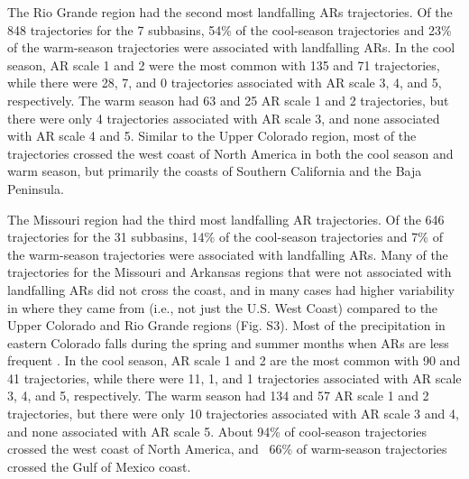 \documentclass[draft]{agujournal2019}
\begin{document}
The Rio Grande region had the second most landfalling ARs trajectories. Of the 848 trajectories for the 7 subbasins, 54\% of the cool-season trajectories and 23\% of the warm-season trajectories were associated with landfalling ARs. In the cool season, AR scale 1 and 2 were the most common with 135 and 71 trajectories, while there were 28, 7, and 0 trajectories associated with AR scale 3, 4, and 5, respectively. The warm season had 63 and 25 AR scale 1 and 2 trajectories, but there were only 4 trajectories associated with AR scale 3, and none associated with AR scale 4 and 5. Similar to the Upper Colorado region, most of the trajectories crossed the west coast of North America in both the cool season and warm season, but primarily the coasts of Southern California and the Baja Peninsula. 

The Missouri region had the third most landfalling AR trajectories. Of the 646 trajectories for the 31 subbasins, 14\% of the cool-season trajectories and 7\% of the warm-season trajectories were associated with landfalling ARs. Many of the trajectories for the Missouri and Arkansas regions that were not associated with landfalling ARs did not cross the coast, and in many cases had higher variability in where they came from (i.e., not just the U.S. West Coast) compared to the Upper Colorado and Rio Grande regions (Fig. S3). Most of the precipitation in eastern Colorado falls during the spring and summer months when ARs are less frequent \cite{Doesken1984Period., Guan2015, Harvey2019CitizensFrom}. In the cool season, AR scale 1 and 2 are the most common with 90 and 41 trajectories, while there were 11, 1, and 1 trajectories associated with AR scale 3, 4, and 5, respectively. The warm season had 134 and 57 AR scale 1 and 2 trajectories, but there were only 10 trajectories associated with AR scale 3 and 4, and none associated with AR scale 5. About 94\% of cool-season trajectories crossed the west coast of North America, and ~66\% of warm-season trajectories crossed the Gulf of Mexico coast. 
\end{document}
